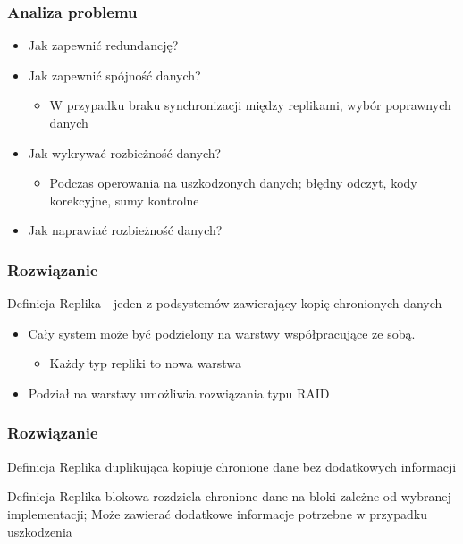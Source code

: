 \documentclass{beamer}
\begin{document}
	\begin{frame}
		\frametitle{Analiza problemu}

		\begin{itemize}
			\item Jak zapewnić redundancję?
			\pause
			\item Jak zapewnić spójność danych?
			\begin{itemize}
				\item W przypadku braku synchronizacji między replikami, wybór poprawnych danych
			\end{itemize}
			\pause
			\item Jak wykrywać rozbieżność danych?
			\begin{itemize}
				\item Podczas operowania na uszkodzonych danych; błędny odczyt, kody korekcyjne, sumy kontrolne 
			\end{itemize}
			\pause
			\item Jak naprawiać rozbieżność danych?
			
		\end{itemize}
	\end{frame}
		
	\begin{frame}
		\frametitle{Rozwiązanie}
			\begin{block}{Definicja}
				Replika - jeden z podsystemów zawierający kopię chronionych danych
			\end{block}
			\pause
			\begin{itemize}
				\item Cały system może być podzielony na warstwy współpracujące ze sobą. 
				\begin{itemize}
					\item Każdy typ repliki to nowa warstwa
				\end{itemize}
				\pause
				\item Podział na warstwy umożliwia rozwiązania typu RAID
			\end{itemize}
			
	\end{frame}

		
\begin{frame}
	\frametitle{Rozwiązanie}
	\begin{block}{Definicja}
		Replika duplikująca kopiuje chronione dane bez dodatkowych informacji
	\end{block}
	\pause
	\begin{block}{Definicja}
		Replika blokowa rozdziela chronione dane na bloki zależne od wybranej implementacji; Może zawierać dodatkowe informacje potrzebne w przypadku uszkodzenia
	\end{block}
\end{frame}
\end{document}
